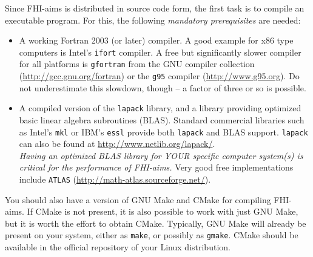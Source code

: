 Since FHI-aims is distributed in source code form, the first task is to
compile an executable program. For this, the following \emph{mandatory
prerequisites} are needed:
\begin{itemize}
\item A working Fortran 2003 (or later) compiler. A good example for x86 type
  computers is Intel's \texttt{ifort} compiler.  A free but significantly slower
  compiler for all platforms is \texttt{gfortran} from the GNU compiler
  collection (\url{http://gcc.gnu.org/fortran}) or the \texttt{g95}
  compiler (\url{http://www.g95.org}). Do not underestimate this
  slowdown, though -- a factor of three or so is possible. 
  \item A compiled version of the \texttt{lapack} library, and a library
    providing optimized basic linear algebra subroutines (BLAS). Standard
    commercial libraries such as Intel's \texttt{mkl} or IBM's \texttt{essl}
    provide both \texttt{lapack} and BLAS support. \texttt{lapack} can also be found at
    \url{http://www.netlib.org/lapack/}. \\
    \emph{Having an optimized BLAS library for YOUR
    specific computer system(s) is critical for the performance of FHI-aims.}
    Very good free implementations include \texttt{ATLAS}
    (\url{http://math-atlas.sourceforge.net/}). 
\end{itemize}
You should also have a version of GNU Make and CMake for compiling FHI-aims. If CMake is not present, it is also possible to work with just GNU Make, but it is worth the effort to obtain CMake. Typically, GNU Make will already be present on your system, either as \texttt{make}, or possibly
as \texttt{gmake}. CMake should be available in the official repository of your Linux distribution.

